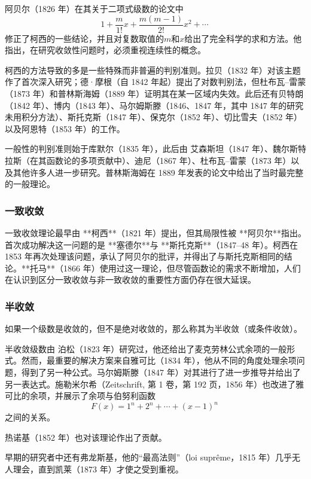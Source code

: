 阿贝尔（1826 年）在其关于二项式级数的论文中
$$
1 + \frac{m}{1!}x + \frac{m(m-1)}{2!}x^{2} + \cdots~
$$
修正了柯西的一些结论，并且对复数取值的$m$和$x$给出了完全科学的求和方法。他指出，在研究收敛性问题时，必须重视连续性的概念。

柯西的方法导致的多是一些特殊而非普遍的判别准则。拉贝（1832 年）对该主题作了首次深入研究；德·摩根（自 1842 年起）提出了对数判别法，但杜布瓦–雷蒙（1873 年）和普林斯海姆（1889 年）证明其在某一区域内失效。此后还有贝特朗（1842 年）、博内（1843 年）、马尔姆斯滕（1846、1847 年，其中 1847 年的研究未用积分方法）、斯托克斯（1847 年）、保克尔（1852 年）、切比雪夫（1852 年）以及阿恩特（1853 年）的工作。

一般性的判别准则始于库默尔（1835 年），此后由 艾森斯坦（1847 年）、魏尔斯特拉斯（在其函数论的多项贡献中）、迪尼（1867 年）、杜布瓦–雷蒙（1873 年）以及其他许多人进一步研究。普林斯海姆在 1889 年发表的论文中给出了当时最完整的一般理论。
\subsubsection{一致收敛}
一致收敛理论最早由 **柯西**（1821 年）提出，但其局限性被 **阿贝尔**指出。首次成功解决这一问题的是 **塞德尔**与 **斯托克斯**（1847–48 年）。柯西在 1853 年再次处理该问题，承认了阿贝尔的批评，并得出了与斯托克斯相同的结论。**托马**（1866 年）使用过这一理论，但尽管函数论的需求不断增加，人们在认识到区分一致收敛与非一致收敛的重要性方面仍存在很大延误。
\subsubsection{半收敛}
如果一个级数是收敛的，但不是绝对收敛的，那么称其为半收敛（或条件收敛）。

半收敛级数由 泊松（1823 年）研究过，他还给出了麦克劳林公式余项的一般形式。然而，最重要的解决方案来自雅可比（1834 年），他从不同的角度处理余项问题，得到了另一种公式。马尔姆斯滕（1847 年）对其进行了进一步推导并给出了另一表达式。施勒米尔希（Zeitschrift, 第 1 卷，第 192 页，1856 年）也改进了雅可比的余项，并展示了余项与伯努利函数
$$
F(x) = 1^{n} + 2^{n} + \cdots + (x-1)^{n}~
$$
之间的关系。

热诺基（1852 年）也对该理论作出了贡献。

早期的研究者中还有弗龙斯基，他的“最高法则”（loi suprême，1815 年）几乎无人理会，直到凯莱（1873 年）才使之受到重视。
